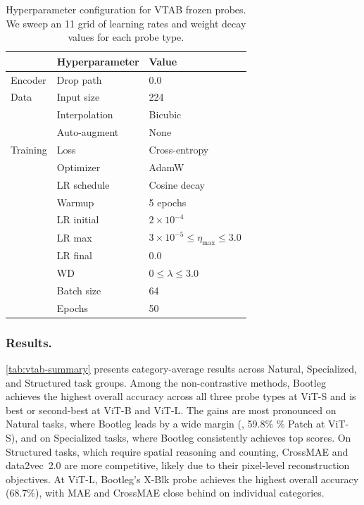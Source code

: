 \begin{table}[tbh]
\centering
\caption{%
Hyperparameter configuration for VTAB frozen probes.
We sweep an 11 grid of learning rates and weight decay values for each probe type.
}
\label{tab:hparams-vtab}
\small
\begin{tabular}{@{}lll@{}}
\toprule
          & Hyperparameter    & Value \\
\midrule
Encoder   & Drop path         & 0.0                 \\
Data      & Input size        & 224\texttimes224    \\
          & Interpolation     & Bicubic             \\
          & Auto-augment      & None                \\
Training  & Loss              & Cross-entropy       \\
          & Optimizer         & AdamW               \\
          & LR schedule       & Cosine decay        \\
          & Warmup            & 5 epochs            \\
          & LR initial        & $2{\times}10^{-4}$  \\
          & LR max            & $3{\times}10^{-5} \leq \eta_{\text{max}} \leq 3.0$ \\
          & LR final          & 0.0                 \\
          & WD                & $0 \leq \lambda \leq 3.0$ \\
          & Batch size        & 64              \\
          & Epochs            & 50              \\
\bottomrule
\end{tabular}
\end{table}

\subsubsection{Results.}
\cref{tab:vtab-summary} presents category-average results across Natural, Specialized, and Structured task groups.
Among the non-contrastive methods, Bootleg achieves the highest overall accuracy across all three probe types at ViT-S and is best or second-best at ViT-B and ViT-L.
The gains are most pronounced on Natural tasks, where Bootleg leads by a wide margin (\eg, 59.8\% \% Patch at ViT-S), and on Specialized tasks, where Bootleg consistently achieves top scores.
On Structured tasks, which require spatial reasoning and counting, CrossMAE and data2vec~2.0 are more competitive, likely due to their pixel-level reconstruction objectives.
At ViT-L, Bootleg's X-Blk probe achieves the highest overall accuracy (68.7\%), with MAE and CrossMAE close behind on individual categories.


